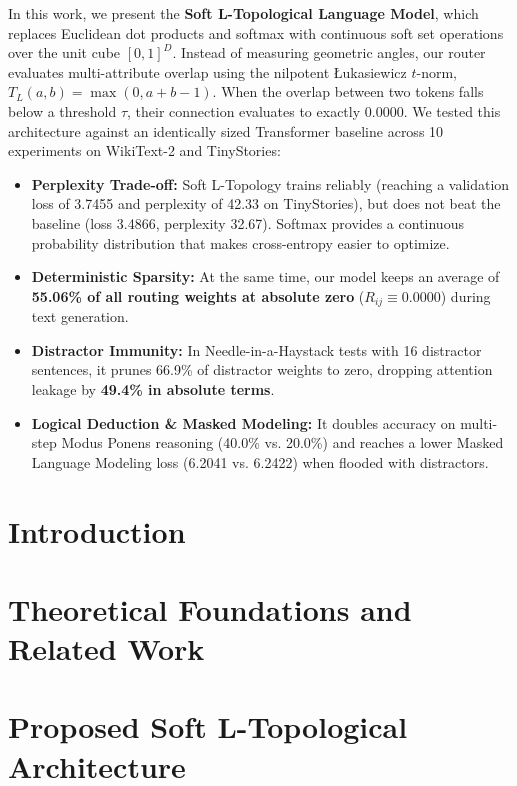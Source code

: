 \documentclass[a4paper, 12pt]{report}
\theoremstyle{definition}
\begin{document}
	In this work, we present the \textbf{Soft L-Topological Language Model}, which replaces Euclidean dot products and softmax with continuous soft set operations over the unit cube $[0, 1]^D$. Instead of measuring geometric angles, our router evaluates multi-attribute overlap using the nilpotent \L{}ukasiewicz $t$-norm, $T_L(a, b) = \max(0, a + b - 1)$. When the overlap between two tokens falls below a threshold $\tau$, their connection evaluates to exactly $0.0000$. We tested this architecture against an identically sized Transformer baseline across 10 experiments on WikiText-2 and TinyStories:
	\begin{itemize}
		\item \textbf{Perplexity Trade-off:} Soft L-Topology trains reliably (reaching a validation loss of 3.7455 and perplexity of 42.33 on TinyStories), but does not beat the baseline (loss 3.4866, perplexity 32.67). Softmax provides a continuous probability distribution that makes cross-entropy easier to optimize.
		\item \textbf{Deterministic Sparsity:} At the same time, our model keeps an average of \textbf{55.06\% of all routing weights at absolute zero} ($R_{ij} \equiv 0.0000$) during text generation.
		\item \textbf{Distractor Immunity:} In Needle-in-a-Haystack tests with 16 distractor sentences, it prunes 66.9\% of distractor weights to zero, dropping attention leakage by \textbf{49.4\% in absolute terms}.
		\item \textbf{Logical Deduction \& Masked Modeling:} It doubles accuracy on multi-step Modus Ponens reasoning (40.0\% vs. 20.0\%) and reaches a lower Masked Language Modeling loss (6.2041 vs. 6.2422) when flooded with distractors.
	\end{itemize}

\clearpage
{}
\setcounter{page}{1}

\chapter{Introduction}


\chapter{Theoretical Foundations and Related Work}


\chapter{Proposed Soft L-Topological Architecture}

\end{document}
